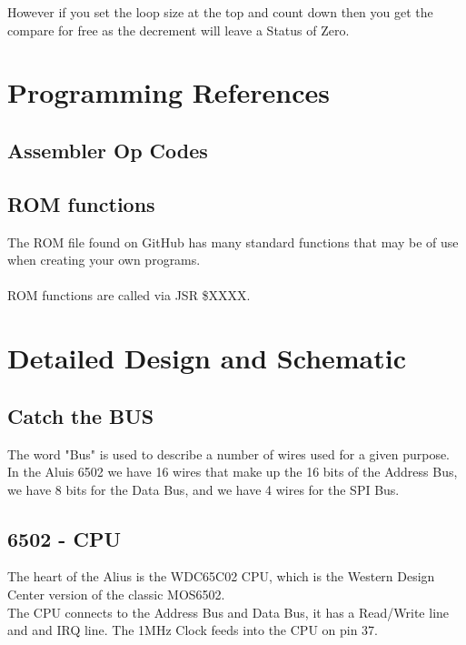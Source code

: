 \documentclass{ol-softwaremanual}
\begin{document}
\begin{ffcode}
However if you set the loop size at the top and count down then you get the compare for free as the decrement will leave a Status of Zero.

\pagebreak

\section{Programming References}

\subsection{Assembler Op Codes}

\pagebreak

\subsection{ROM functions}
The ROM file found on GitHub has many standard functions that may be of use when creating your own programs.\\
\\
ROM functions are called via JSR \$XXXX.\\



\pagebreak

\section{Detailed Design and Schematic}

\subsection{Catch the BUS}
The word "Bus" is used to describe a number of wires used for a given purpose. In the Aluis 6502 we have 16 wires that make up the 16 bits of the Address Bus, we have 8 bits for the Data Bus, and we have 4 wires for the SPI Bus.

\subsection{6502 - CPU}
The heart of the Alius is the WDC65C02 CPU, which is the Western Design Center version of the classic MOS6502.\\
The CPU connects to the Address Bus and Data Bus, it has a Read/Write line and and IRQ line.
The 1MHz Clock feeds into the CPU on pin 37.


\end{ffcode}
\end{document}
